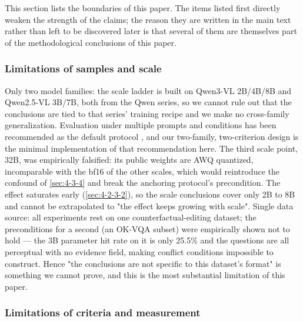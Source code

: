 \documentclass[pdflatex,sn-basic,Numbered]{sn-jnl}
\theoremstyle{thmstyleone}
\theoremstyle{thmstyletwo}
\theoremstyle{thmstylethree}
\begin{document}
This section lists the boundaries of this paper. The items listed first directly weaken the strength of the claims; the reason they are written in the main text rather than left to be discovered later
is that several of them are themselves part of the methodological conclusions of this paper.

\subsubsection{Limitations of samples and scale}
\label{sec:4-8-1}

Only two model families: the scale ladder is built on Qwen3-VL 2B/4B/8B and Qwen2.5-VL 3B/7B,
both from the Qwen series, so we cannot rule out that the conclusions are tied to that series'
training recipe and we make no cross-family generalization. Evaluation under multiple prompts
and conditions has been recommended as the default protocol \cite{ref39,ref38}, and our two-family,
two-criterion design is the minimal implementation of that recommendation here. The third scale
point, 32B, was empirically falsified: its public weights are AWQ quantized, incomparable with
the bf16 of the other scales, which would reintroduce the confound of \ref{sec:4-3-4} and break the
anchoring protocol's precondition. The effect saturates early (\ref{sec:4-2-3-2}), so the scale
conclusions cover only 2B to 8B and cannot be extrapolated to "the effect keeps growing with
scale". Single data source: all experiments rest on one counterfactual-editing dataset; the
preconditions for a second (an OK-VQA subset) were empirically shown not to hold — the 3B
parameter hit rate on it is only 25.5\% and the questions are all perceptual with no evidence
field, making conflict conditions impossible to construct. Hence "the conclusions are not
specific to this dataset's format" is something we cannot prove, and this is the most
substantial limitation of this paper.

\subsubsection{Limitations of criteria and measurement}
\label{sec:4-8-2}
\end{document}
